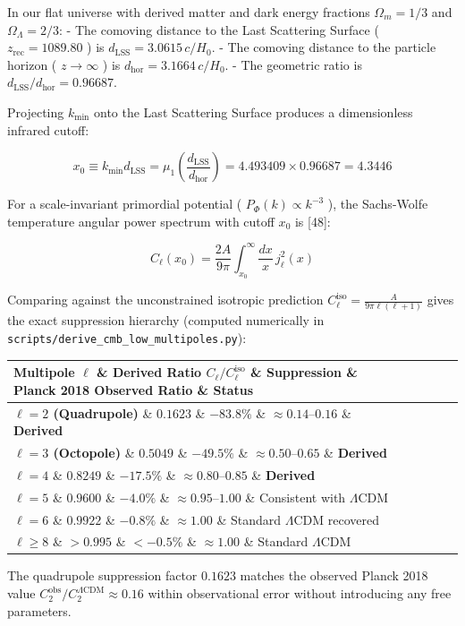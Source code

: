 \documentclass[11pt,a4paper]{article}
\theoremstyle{definition}\newtheorem{definition}{Definition}
\theoremstyle{remark}\newtheorem{remark}{Remark}
\begin{document}
In our flat universe with derived matter and dark energy fractions $\Omega_m = 1/3$ and $\Omega_\Lambda = 2/3$:
- The comoving distance to the Last Scattering Surface ( $z_{\text{rec}} = 1089.80$ ) is $d_{\text{LSS}} = 3.0615 \, c/H_0$.
- The comoving distance to the particle horizon ( $z \to \infty$ ) is $d_{\text{hor}} = 3.1664 \, c/H_0$.
- The geometric ratio is $d_{\text{LSS}} / d_{\text{hor}} = 0.96687$.

Projecting $k_{\text{min}}$ onto the Last Scattering Surface produces a dimensionless infrared cutoff:


\begin{equation}
x_0 \equiv k_{\text{min}} d_{\text{LSS}} = \mu_1 \left(\frac{d_{\text{LSS}}}{d_{\text{hor}}}\right) = 4.493409 \times 0.96687 = 4.3446
\end{equation}


For a scale-invariant primordial potential ( $P_\Phi(k) \propto k^{-3}$ ), the Sachs-Wolfe temperature angular power spectrum with cutoff $x_0$ is [48]:


\begin{equation}
C_\ell(x_0) = \frac{2A}{9\pi} \int_{x_0}^\infty \frac{dx}{x} \, j_\ell^2(x)
\end{equation}


Comparing against the unconstrained isotropic prediction $C_\ell^{\text{iso}} = \frac{A}{9\pi \ell(\ell+1)}$ gives the exact suppression hierarchy (computed numerically in \texttt{scripts/derive_cmb_low_multipoles.py}):

\begin{longtable}{lllll}
\hline
Multipole $\ell$ \& Derived Ratio $C_\ell / C_\ell^{\text{iso}}$ \& Suppression \& Planck 2018 Observed Ratio \& Status \\
\hline
\textbf{$\ell = 2$ (Quadrupole)} \& \textbf{$0.1623$} \& \textbf{$-83.8\%$} \& $\approx 0.14\text{--}0.16$ \& \textbf{Derived} \\
\textbf{$\ell = 3$ (Octopole)} \& \textbf{$0.5049$} \& \textbf{$-49.5\%$} \& $\approx 0.50\text{--}0.65$ \& \textbf{Derived} \\
\textbf{$\ell = 4$} \& \textbf{$0.8249$} \& \textbf{$-17.5\%$} \& $\approx 0.80\text{--}0.85$ \& \textbf{Derived} \\
\textbf{$\ell = 5$} \& \textbf{$0.9600$} \& \textbf{$-4.0\%$} \& $\approx 0.95\text{--}1.00$ \& Consistent with $\Lambda\text{CDM}$ \\
\textbf{$\ell = 6$} \& \textbf{$0.9922$} \& \textbf{$-0.8\%$} \& $\approx 1.00$ \& Standard $\Lambda\text{CDM}$ recovered \\
\textbf{$\ell \ge 8$} \& \textbf{$> 0.995$} \& \textbf{$< -0.5\%$} \& $\approx 1.00$ \& Standard $\Lambda\text{CDM}$ \\
\hline
\end{longtable}
The quadrupole suppression factor $0.1623$ matches the observed Planck 2018 value $C_2^{\text{obs}}/C_2^{\Lambda\text{CDM}} \approx 0.16$ within observational error without introducing any free parameters.
\end{document}
